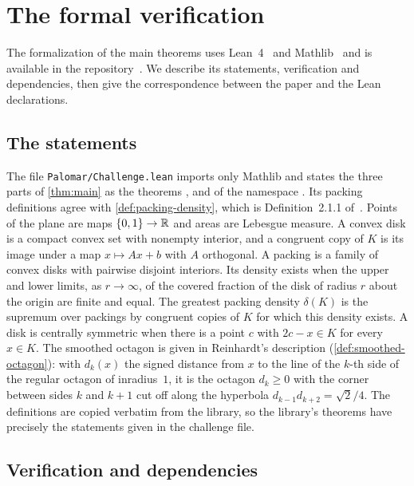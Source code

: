 \section{The formal verification}\label{app:formal}

The formalization of the main theorems uses Lean~4~\cite{Lean4} and Mathlib~\cite{Mathlib20} and
is available in the repository~\cite{Companion}. We describe its statements, verification and
dependencies, then give the correspondence between the paper and the Lean declarations.

\subsection{The statements}\label{app:formal-statements}

The file \texttt{Palomar/Challenge.lean} imports only Mathlib and states the three parts of
\cref{thm:main} as the theorems ,  and
 of the namespace . Its packing definitions
agree with \cref{def:packing-density}, which is Definition~2.1.1 of~\cite{HalesVajjha2024}. Points
of the plane are maps $\{0,1\}\to\mathbb{R}$ and areas are Lebesgue measure. A convex disk is a compact
convex set with nonempty interior, and a congruent copy of $K$ is its image under a map $x\mapsto
Ax+b$ with $A$ orthogonal. A packing is a family of convex disks with pairwise disjoint interiors.
Its density exists when the upper and lower limits, as $r\to\infty$, of the covered fraction of
the disk of radius $r$ about the origin are finite and equal. The greatest packing density
$\delta(K)$ is the supremum over packings by congruent copies of $K$ for which this density
exists. A disk is centrally symmetric when there is a point $c$ with $2c-x\in K$ for every $x\in
K$. The smoothed octagon is given in Reinhardt's description (\cref{def:smoothed-octagon}): with
$d_k(x)$ the signed distance from $x$ to the line of the $k$-th side of the regular octagon of
inradius~$1$, it is the octagon $d_k\ge0$ with the corner between sides $k$ and $k+1$ cut off
along the hyperbola $d_{k-1}d_{k+2}=\sqrt2/4$. The definitions are copied verbatim from the
library, so the library's theorems have precisely the statements given in the challenge file.

\subsection{Verification and dependencies}\label{app:formal-check}

